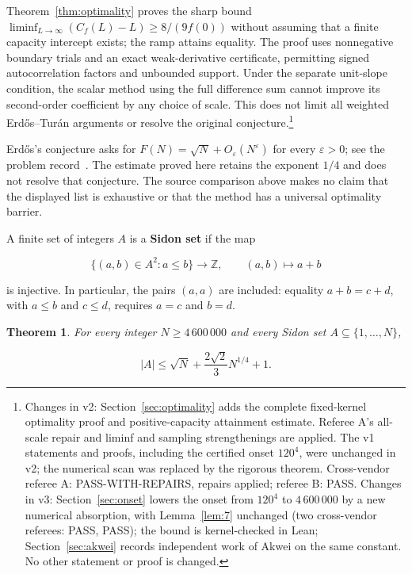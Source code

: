 \documentclass[10pt]{article}
\makeatletter
\numberwithin{equation}{section}
\newtheorem{theorem}{Theorem}[section]
\theoremstyle{remark}
\renewcommand\section{\@startsection{section}{1}{\z@}{-2.6ex \@plus -.8ex \@minus -.2ex}{1.3ex \@plus .2ex}{\normalfont\large\bfseries}}
\makeatother
\begin{document}
Theorem~\ref{thm:optimality} proves the sharp bound
$\liminf_{L\to\infty}(C_f(L)-L)\ge8/(9f(0))$ without assuming that a
finite capacity intercept exists; the ramp attains equality. The
proof uses nonnegative boundary trials and an exact weak-derivative
certificate, permitting signed autocorrelation factors and unbounded
support. Under the separate unit-slope condition, the scalar method
using the full difference sum cannot improve its second-order
coefficient by any choice of scale.
This does not limit all weighted Erd\H{o}s--Tur\'an arguments or
resolve the original conjecture.\footnote{Changes in v2:
Section~\ref{sec:optimality} adds the complete fixed-kernel optimality
proof and positive-capacity attainment estimate. Referee A's all-scale
repair and liminf and sampling strengthenings are applied. The v1
statements and proofs, including the certified onset $120^4$, were
unchanged in v2; the numerical scan was replaced by the rigorous theorem.
Cross-vendor referee A: PASS-WITH-REPAIRS, repairs applied; referee B: PASS.
Changes in v3: Section~\ref{sec:onset} lowers the onset from $120^4$ to
$4\,600\,000$ by a new numerical absorption, with Lemma~\ref{lem:7}
unchanged (two cross-vendor referees: PASS, PASS); the bound is
kernel-checked in Lean; Section~\ref{sec:akwei} records independent work
of Akwei on the same constant. No other statement or proof is changed.}

Erd\H{o}s's conjecture asks for
$F(N)=\sqrt N+O_\varepsilon(N^\varepsilon)$ for every $\varepsilon>0$;
see the problem record~\cite{EP30}. The estimate proved here retains the
exponent $1/4$ and does not resolve that conjecture. The source comparison
above makes no claim that the displayed list is exhaustive or that the
method has a universal optimality barrier.

\section{Statement}\label{sec:statement}

A finite set of integers \(A\) is a \textbf{Sidon set} if the map

\[
\{(a,b)\in A^2:a\le b\}\longrightarrow\mathbb Z,
\qquad (a,b)\longmapsto a+b
\]

is injective. In particular, the pairs \((a,a)\) are included: equality
\(a+b=c+d\), with \(a\le b\) and \(c\le d\), requires \(a=c\) and \(b=d\).

\begin{theorem}\label{thm:main} For every integer \(N\ge4\,600\,000\) and every Sidon set
\(A\subseteq\{1,\ldots,N\}\),

\begin{equation}
\boxed{|A|\le\sqrt N+\frac{2\sqrt2}{3}N^{1/4}+1.}
\label{eq:s1-1}
\end{equation}
\end{theorem}
\end{document}
